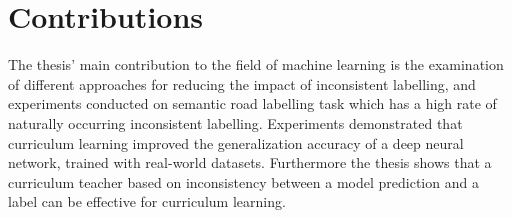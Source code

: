 \section{Contributions}
\label{sec:IntroContributions}
The thesis' main contribution to the field of machine learning  is the examination of different approaches for reducing the impact of inconsistent labelling, and experiments conducted on semantic road labelling task which has a high rate of naturally occurring inconsistent labelling. Experiments demonstrated that curriculum learning improved the generalization accuracy of a deep neural network, trained with real-world datasets. Furthermore the thesis shows that a curriculum teacher based on inconsistency between a model prediction and a label can be effective for curriculum learning.